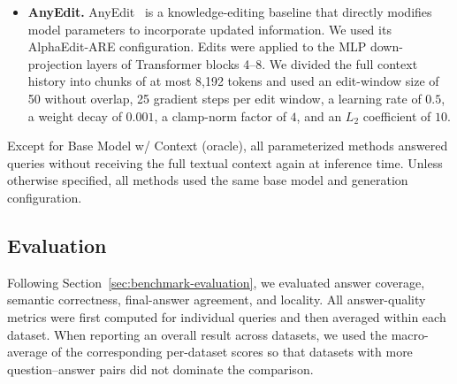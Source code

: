 \begin{itemize}
\item \textbf{AnyEdit.}
AnyEdit~\citep{jiang2025anyedit} is a knowledge-editing baseline that directly modifies model parameters to incorporate updated information. We used its AlphaEdit-ARE configuration. Edits were applied to the MLP down-projection layers of Transformer blocks 4--8. We divided the full context history into chunks of at most 8,192 tokens and used an edit-window size of 50 without overlap, 25 gradient steps per edit window, a learning rate of $0.5$, a weight decay of $0.001$, a clamp-norm factor of $4$, and an $L_2$ coefficient of $10$.

\end{itemize}

Except for Base Model w/ Context (oracle), all parameterized methods answered queries without receiving the full textual context again at inference time. Unless otherwise specified, all methods used the same base model and generation configuration.

\subsection{Evaluation}
\label{app:evaluation-setup}

Following Section~\ref{sec:benchmark-evaluation}, we evaluated answer coverage, semantic correctness, final-answer agreement, and locality. All answer-quality metrics were first computed for individual queries and then averaged within each dataset. When reporting an overall result across datasets, we used the macro-average of the corresponding per-dataset scores so that datasets with more question--answer pairs did not dominate the comparison.

